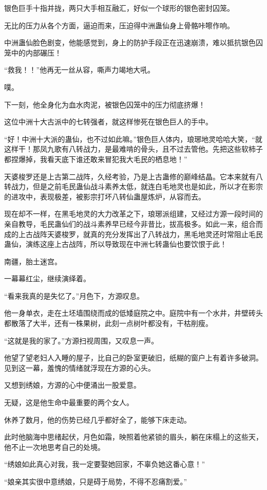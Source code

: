 \begin{this_body}
银色巨手十指并拢，两只大手相互融汇，好似一个球形的银色密封囚笼。

无比的压力从各个方面，逼迫而来，压迫得中洲蛊仙身上骨骼咔嚓作响。

中洲蛊仙脸色剧变，他能感觉到，身上的防护手段正在迅速崩溃，难以抵抗银色囚笼中的内部碾压！

“救我！！”他再无一丝从容，嘶声力竭地大吼。

噗。

下一刻，他全身化为血水肉泥，被银色囚笼中的压力彻底挤爆！

这位中洲十大古派中的七转强者，就这样惨死在银色巨人的手中。

“好！中洲十大派的蛊仙，也不过如此嘛。”银色巨人体内，琅琊地灵哈哈大笑，“就这样干！那凤九歌有八转战力，是最难啃的骨头，且不过去管他。先把这些软柿子都捏爆掉，我看天底下谁还敢来冒犯我大毛民的栖息地！”

天婆梭罗还是上古第二战阵，久经考验，乃是上古蛊修的巅峰结晶。它本来就有八转战力，但是之前毛民蛊仙战斗素养太低，就连白毛地灵也是如此，所以才在影宗的进攻中，表现极差，被影宗打坏八转仙蛊屋炼炉，从容而去。

现在却不一样，在黑毛地灵的大力改革之下，琅琊派组建，又经过方源一段时间的亲自教导，毛民蛊仙们的战斗素养早已经今非昔比，拔高极多。如此一来，组合而成的上古战阵天婆梭罗，就真的充分发挥出了八转战力，黑毛地灵还时常阻止毛民蛊仙，演练这座上古战阵，所以导致现在中洲七转蛊仙也要饮恨于此！

南疆，胎土迷宫。

一幕幕红尘，继续演绎着。

“看来我真的是失忆了。”月色下，方源叹息。

他一身单衣，走在土坯墙围绕而成的低矮庭院之中。庭院中有一个水井，井壁砖头都散落了大半，还有一株果树，此刻一点树叶都没有，干枯削瘦。

“这就是我的家了。”方源扫视周围，又叹息一声。

他望了望老妇人入睡的屋子，比自己的卧室更破旧，纸糊的窗户上有着许多破洞。见到这一幕，羞愧的情绪就浮现在方源的心头。

又想到绣娘，方源的心中便涌出一股爱意。

无疑，这是他生命中最重要的两个女人。

休养了数月，他的伤势已经几乎都好全了，能够下床走动。

此时他脑海中思绪起伏，月色如霜，映照着他紧锁的眉头，躺在床榻上的这些天，他不止一次地思考自己的处境。

“绣娘如此真心对我，我一定要娶她回家，不辜负她这番心意！”

“娘亲其实很中意绣娘，只是碍于局势，不得不忍痛割爱。”


\end{this_body}
